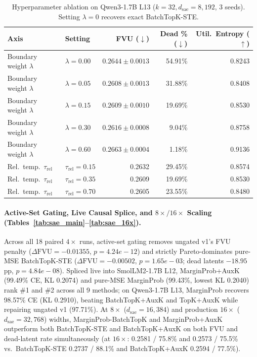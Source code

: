 \documentclass[10pt]{article}
\begin{document}
\begin{table}[t]
  \centering
  \caption{Hyperparameter ablation on Qwen3-1.7B L13 ($k=32, d_{\mathrm{sae}}=8{,}192$, 3 seeds). Setting $\lambda=0$ recovers exact BatchTopK-STE.}
  \label{tab:sae_ablation}
  \scriptsize
  \begin{tabular}{llrrr}
    \toprule
    Axis & Setting & FVU ($\downarrow$) & Dead \% ($\downarrow$) & Util.\ Entropy ($\uparrow$) \\
    \midrule
        Boundary weight $\lambda$ & $\lambda=0.00$ & $0.2644\pm0.0013$ & 54.91\% & 0.8243 \\
    Boundary weight $\lambda$ & $\lambda=0.05$ & $0.2608\pm0.0013$ & 31.88\% & 0.8408 \\
    Boundary weight $\lambda$ & $\lambda=0.15$ & $0.2609\pm0.0010$ & 19.69\% & 0.8530 \\
    Boundary weight $\lambda$ & $\lambda=0.30$ & $0.2616\pm0.0008$ & 9.04\% & 0.8758 \\
    Boundary weight $\lambda$ & $\lambda=0.60$ & $0.2663\pm0.0004$ & 1.18\% & 0.9136 \\
    \midrule
    Rel.\ temp.\ $\tau_{\mathrm{rel}}$ & $\tau_{\mathrm{rel}}=0.15$ & 0.2632 & 29.45\% & 0.8574 \\
    Rel.\ temp.\ $\tau_{\mathrm{rel}}$ & $\tau_{\mathrm{rel}}=0.35$ & 0.2609 & 19.69\% & 0.8530 \\
    Rel.\ temp.\ $\tau_{\mathrm{rel}}$ & $\tau_{\mathrm{rel}}=0.70$ & 0.2605 & 23.55\% & 0.8480 \\
    \bottomrule
  \end{tabular}
\end{table}

\paragraph{Active-Set Gating, Live Causal Splice, and $8\times/16\times$ Scaling (Tables~\ref{tab:sae_main}--\ref{tab:sae_16x}).} Across all 18 paired $4\times$ runs, active-set gating removes ungated v1's FVU penalty ($\Delta\mathrm{FVU} = -0.01355$, $p=4.24e-12$) and strictly Pareto-dominates pure-MSE BatchTopK-STE ($\Delta\mathrm{FVU} = -0.00502$, $p=1.65e-03$; dead latents $-18.95$\,pp, $p=4.84e-08$). Spliced live into SmolLM2-1.7B L12, MarginProb+AuxK (99.49\% CE, KL 0.2074) and pure-MSE MarginProb (99.43\%, lowest KL 0.2040) rank \#1 and \#2 across all 9 methods; on Qwen3-1.7B L13, MarginProb recovers 98.57\% CE (KL 0.2910), beating BatchTopK+AuxK and TopK+AuxK while repairing ungated v1 (97.71\%). At $8\times$ ($d_{\mathrm{sae}}=16{,}384$) and production $16\times$ ($d_{\mathrm{sae}}=32{,}768$) widths, MarginProb-BatchTopK and MarginProb+AuxK outperform both BatchTopK-STE and BatchTopK+AuxK on both FVU and dead-latent rate simultaneously (at $16\times$: 0.2581 / 75.8\% and 0.2573 / 75.5\% vs.\ BatchTopK-STE 0.2737 / 88.1\% and BatchTopK+AuxK 0.2594 / 77.5\%).
\end{document}

